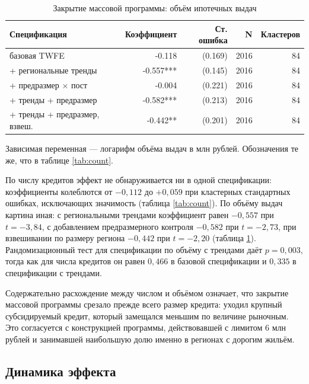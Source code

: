 \documentclass[
  russian,
  11pt,
]{article}
\begin{document}
\begin{table}[htbp]
\centering
\small
\caption{Закрытие массовой программы: объём ипотечных выдач}
\label{tab:volume}
\begin{tabular}{lrrrr}
\toprule
Спецификация & Коэффициент & Ст. ошибка & N & Кластеров \\
\midrule
базовая TWFE & -0.118 & (0.169) & 2016 & 84 \\
+ региональные тренды & -0.557*** & (0.145) & 2016 & 84 \\
+ предразмер × пост & -0.004 & (0.221) & 2016 & 84 \\
+ тренды + предразмер & -0.582*** & (0.213) & 2016 & 84 \\
+ тренды + предразмер, взвеш. & -0.442** & (0.201) & 2016 & 84 \\
\bottomrule
\end{tabular}
\par\smallskip\begin{minipage}{0.92\textwidth}\footnotesize
Зависимая переменная — логарифм объёма выдач в млн рублей. Обозначения те же, что в таблице \ref{tab:count}. 
\end{minipage}
\end{table}

По числу кредитов эффект не обнаруживается ни в одной спецификации:
коэффициенты колеблются от \(-0{,}112\) до \(+0{,}059\) при кластерных
стандартных ошибках, исключающих значимость (таблица \ref{tab:count}).
По объёму выдач картина иная: с региональными трендами коэффициент равен
\(-0{,}557\) при \(t = -3{,}84\), с добавлением предразмерного контроля
\(-0{,}582\) при \(t = -2{,}73\), при взвешивании по размеру региона
\(-0{,}442\) при \(t = -2{,}20\) (таблица \ref{tab:volume}).
Рандомизационный тест для спецификации по объёму с трендами даёт
\(p = 0{,}003\), тогда как для числа кредитов он равен \(0{,}466\) в
базовой спецификации и \(0{,}335\) в спецификации с трендами.

Содержательно расхождение между числом и объёмом означает, что закрытие
массовой программы срезало прежде всего размер кредита: уходил крупный
субсидируемый кредит, который замещался меньшим по величине рыночным.
Это согласуется с конструкцией программы, действовавшей с лимитом 6 млн
рублей и занимавшей наибольшую долю именно в регионах с дорогим жильём.

\subsection{Динамика
эффекта}\label{ux434ux438ux43dux430ux43cux438ux43aux430-ux44dux444ux444ux435ux43aux442ux430}
\end{document}
